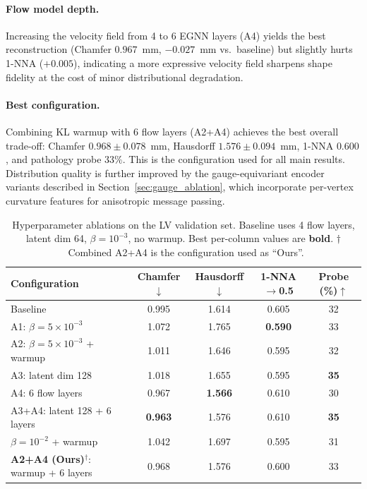 \documentclass{article}
\begin{document}
\paragraph{Flow model depth.}
Increasing the velocity field from 4 to 6 EGNN layers (A4) yields the
best reconstruction (Chamfer $0.967$~mm, $-0.027$~mm vs.\ baseline) but
slightly hurts 1-NNA ($+0.005$), indicating a more expressive velocity
field sharpens shape fidelity at the cost of minor distributional
degradation.

\paragraph{Best configuration.}
Combining KL warmup with 6 flow layers (A2+A4) achieves the best overall
trade-off: Chamfer $0.968 \pm 0.078$~mm, Hausdorff $1.576 \pm 0.094$~mm,
1-NNA $0.600$, and pathology probe $33\%$.
This is the configuration used for all main results.
Distribution quality is further improved by the gauge-equivariant encoder
variants described in Section~\ref{sec:gauge_ablation}, which incorporate
per-vertex curvature features for anisotropic message passing.

\begin{table}[h]
\centering
\caption{Hyperparameter ablations on the LV validation set.
         Baseline uses 4 flow layers, latent dim 64, $\beta{=}10^{-3}$,
         no warmup. Best per-column values are \textbf{bold}.
         $\dagger$~Combined A2+A4 is the configuration used as ``Ours''.}
\label{tab:ablations}
\begin{tabular}{lcccc}
\toprule
Configuration & Chamfer$\downarrow$ & Hausdorff$\downarrow$ & 1-NNA$\rightarrow$0.5 & Probe (\%)$\uparrow$ \\
\midrule
Baseline                                    & 0.995 & 1.614 & 0.605 & 32 \\
A1: $\beta{=}5{\times}10^{-3}$             & 1.072 & 1.765 & \textbf{0.590} & 33 \\
A2: $\beta{=}5{\times}10^{-3}$ + warmup    & 1.011 & 1.646 & 0.595 & 32 \\
A3: latent dim 128                          & 1.018 & 1.655 & 0.595 & \textbf{35} \\
A4: 6 flow layers                           & 0.967 & \textbf{1.566} & 0.610 & 30 \\
A3+A4: latent 128 + 6 layers                & \textbf{0.963} & 1.576 & 0.610 & \textbf{35} \\
$\beta{=}10^{-2}$ + warmup                  & 1.042 & 1.697 & 0.595 & 31 \\
\midrule
\textbf{A2+A4 (Ours)}$^\dagger$: warmup + 6 layers & 0.968 & 1.576 & 0.600 & 33 \\
\bottomrule
\end{tabular}
\end{table}
\end{document}
